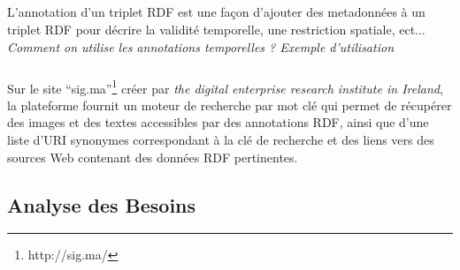 \documentclass[12pt,a4	]{report}
\begin{document}
\subparagraph{}
L'annotation d'un triplet RDF est une façon d'ajouter des metadonnées à un triplet RDF pour décrire la validité temporelle, une restriction spatiale, ect...
\newline
\textit{Comment on utilise les annotations temporelles ? Exemple d'utilisation}
\subparagraph{}
Sur le site ``sig.ma''\footnote{http://sig.ma/} créer par \textit{the digital enterprise research institute in Ireland}, la plateforme fournit un moteur de recherche par mot clé qui permet de récupérer des images et des textes accessibles par des annotations RDF, ainsi que d'une liste d'URI synonymes correspondant à la clé de recherche et des liens vers des sources Web contenant des données RDF pertinentes.
\subsection*{Analyse des Besoins}
\end{document}
